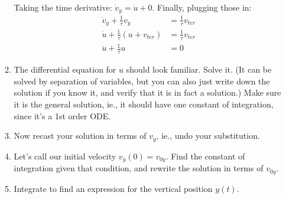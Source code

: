 \documentclass[12pt]{article}
\begin{document}
\begin{enumerate}
\begin{enumerate}[resume]
{      Taking the time derivative: $\dot v_y = \dot u + 0$. Finally, plugging those in:
      \begin{align*}
        \dot v_y + \frac{1}{\tau} v_y &= \frac{1}{\tau} v_{ter}\\
        \dot u + \frac{1}{\tau} (u + v_{ter}) &= \frac{1}{\tau} v_{ter}\\
        \dot u + \frac{1}{\tau} u &= 0
      \end{align*}
    }

    \item The differential equation for $u$ should look familiar. Solve it. (It can be solved by separation of variables, but you can also just write down the solution if you know it, and verify that it is in fact a solution.) Make sure it is the general solution, ie., it should have one constant of integration, since it's a 1st order ODE.

    \item Now recast your solution in terms of $v_y$, ie., undo your substitution.



          \item Let's call our initial velocity $v_y(0) = v_{0y}$. Find the constant of integration given that condition, and rewrite the solution in terms of $v_{0y}$.


        \item Integrate to find an expression for the vertical position $y(t)$.


\end{enumerate}
\end{enumerate}
\end{document}
